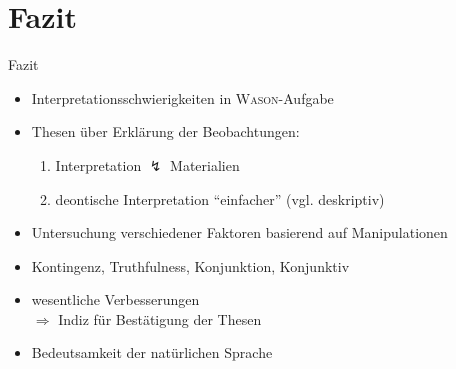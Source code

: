 
\section{Fazit}

\begin{frame}{Fazit}
    \begin{itemize}
        \item Interpretations\alert{schwierigkeiten} in \textsc{Wason}-Aufgabe
        \item Thesen über Erklärung der Beobachtungen:
        \begin{enumerate}
            \item Interpretation $\lightning$ Materialien
            \item deontische \alert{Interpretation} \enquote{einfacher} {\small (vgl. deskriptiv)}
        \end{enumerate}
        \item Untersuchung verschiedener Faktoren basierend auf \alert{Manipulationen}
        \item Kontingenz, Truthfulness, Konjunktion, Konjunktiv
        \item wesentliche Verbesserungen \\
            $\Rightarrow$ Indiz für Bestätigung der Thesen
        \item Bedeutsamkeit der \alert{natürlichen Sprache}
    \end{itemize}
\end{frame}
